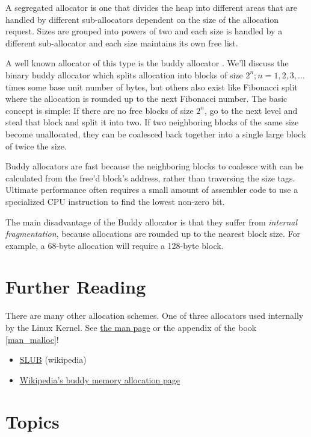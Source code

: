 A segregated allocator is one that divides the heap into different areas that are handled by different sub-allocators dependent on the size of the allocation request.
Sizes are grouped into powers of two and each size is handled by a different sub-allocator and each size maintains its own free list.

A well known allocator of this type is the buddy allocator \cite[P. 85]{rangan1999foundations}.
We'll discuss the binary buddy allocator which splits allocation into blocks of size $2^n; n = 1, 2, 3, ...$ times some base unit number of bytes, but others also exist like Fibonacci split where the allocation is rounded up to the next Fibonacci number.
The basic concept is simple: If there are no free blocks of size $2^n$, go to the next level and steal that block and split it into two.
If two neighboring blocks of the same size become unallocated, they can be coalesced back together into a single large block of twice the size.

Buddy allocators are fast because the neighboring blocks to coalesce with can be calculated from the free'd block's address, rather than traversing the size tags.
Ultimate performance often requires a small amount of assembler code to use a specialized CPU instruction to find the lowest non-zero bit.

The main disadvantage of the Buddy allocator is that they suffer from \emph{internal fragmentation}, because allocations are rounded up to the nearest block size.
For example, a 68-byte allocation will require a 128-byte block.

\section{Further Reading}

There are many other allocation schemes.
One of three allocators used internally by the Linux Kernel.
See \href{http://man7.org/linux/man-pages/man3/malloc.3.html}{the man page} or the appendix of the book \ref{man_malloc}!

\begin{itemize}
\item
  \href{http://en.wikipedia.org/wiki/SLUB_\%28software\%29}{SLUB} (wikipedia)
\item
  \href{http://en.wikipedia.org/wiki/Buddy_memory_allocation}{Wikipedia's buddy memory allocation page}
\end{itemize}

\section{Topics}

